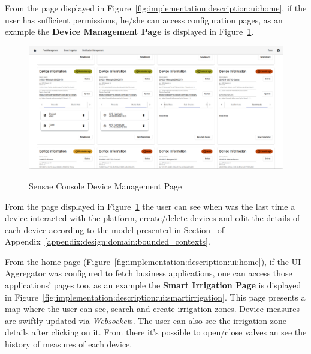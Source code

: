 From the page displayed in Figure~\ref{fig:implementation:description:ui:home}, if the user has sufficient permissions, he/she can access configuration pages, as an example the \textbf{Device Management Page} is displayed in Figure~\ref{fig:implementation:description:ui:device}.

\begin{figure}[H]
    \centering
    \resizebox{\columnwidth}{!}
    {
       \includegraphics{assets/figures/ui/device-management.png}
    }
    \caption[Sensae Console - Device Management Page]{Sensae Console Device Management Page}
    \label{fig:implementation:description:ui:device}
\end{figure}

From the page displayed in Figure~\ref{fig:implementation:description:ui:device} the user can see when was the last time a device interacted with the platform, create/delete devices and edit the details of each device according to the model presented in Section~ of Appendix~\ref{appendix:design:domain:bounded_contexts}.

From the home page (Figure~\ref{fig:implementation:description:ui:home}), if the UI Aggregator was configured to fetch business applications, one can access those applications' pages too, as an example the \textbf{Smart Irrigation Page} is displayed in Figure~\ref{fig:implementation:description:ui:smartirrigation}.
This page presents a map where the user can see, search and create irrigation zones. Device measures are swiftly updated via \textit{Websocket}s. The user can also see the irrigation zone details after clicking on it. From there it's possible to open/close valves an see the history of measures of each device.

